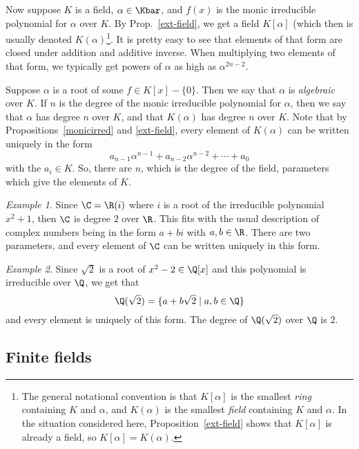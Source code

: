 \documentclass[12pt]{amsart}
\theoremstyle{plain}
\theoremstyle{definition}
\theoremstyle{remark}
\newtheorem*{exam}{Example}
\begin{document}
Now suppose $K$ is a field, $\alpha\in\Kbar$, and $f(x)$ is the monic
irreducible polynomial for $\alpha$ over $K$.  By
Prop.~\ref{ext-field}, we get a field $K[\alpha]$ (which then is usually
denoted $K(\alpha)$\footnote{The general notational convention is that
$K[\alpha]$ is the smallest {\em ring} containing $K$ and $\alpha$, and
$K(\alpha)$ is the smallest {\em field} containing $K$ and $\alpha$.  In
the situation considered here, Proposition~\ref{ext-field} shows that $K[\alpha]$
is already a field, so $K[\alpha]=K(\alpha)$.}.  It is pretty easy
to see that elements of that form are closed under addition and
additive inverse.  When multiplying two elements of that form, we
typically get powers of $\alpha$ as high as $\alpha^{2n-2}$.

Suppose $\alpha$ is a root of some $f\in K[x]-\{0\}$.  Then we say
that $\alpha$ is {\em algebraic} over $K$.  If $n$ is the degree of 
the monic irreducible polynomial for $\alpha$, then we say that $\alpha$
has degree $n$ over $K$, and that $K(\alpha)$ has degree $n$ over $K$.
Note that by Propositions~\ref{monicirred} and \ref{ext-field},
every element of $K(\alpha)$ can be written uniquely in the form
\[ a_{n-1} \alpha^{n-1}+a_{n-2}\alpha^{n-2}+\cdots + a_0\]
with the $a_i\in K$.  So, there are $n$, which is the degree of the field,
parameters which give the elements of $K$.

\begin{exam}
  Since $\C=\R(i)$ where $i$ is a root of the irreducible polynomial $x^2+1$,
  then $\C$ is degree $2$ over $\R$.  This fits with the usual description of
  complex numbers being in the form $a+bi$ with $a,b\in \R$.  There are two
  parameters, and every element of $\C$ can be written uniquely in this form.
\end{exam}

\begin{exam}
  Since $\sqrt{2}$ is a root of $x^2-2\in \Q[x]$ and this polynomial is irreducible
  over $\Q$, we get that
  \[ \Q(\sqrt{2}) = \{a+b\sqrt{2}\mid a,b\in \Q\}\]
  and every element is uniquely of this form.  The degree of $\Q(\sqrt2)$ over $\Q$
  is $2$.
\end{exam}

\subsection{Finite fields}
\end{document}
